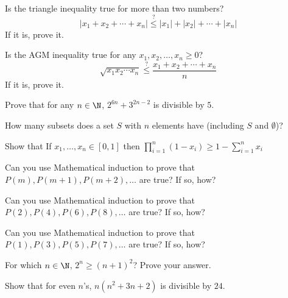 %
%

\begin{exercises}
	\begin{problist}
		\prob Is the triangle inequality true for more than two numbers?
			$$
			|x_1 + x_2 + \cdots + x_n| \stackrel{?}{\leq} |x_1| + |x_2| + \cdots + |x_n| 
			$$
			If it is, prove it.
			
		\prob Is the AGM inequality true for any $x_1, x_2, \ldots, x_n \geq 0$?
			$$
			\sqrt{x_1 x_2 \cdots x_n} \stackrel{?}{\leq}\frac{x_1 + x_2 + \cdots + x_n}{n}
			$$
			If it is, prove it.
			
		\prob Prove that for any $n \in \N$, $2^{6n}+3^{2n-2}$ is divisible by $5$.


		\prob How many subsets does a set $S$ with $n$ elements have (including $S$ and $\emptyset$)?
		
		\prob Show that If $x_1, \ldots, x_n \in [0,1]$ then $\displaystyle \prod_{i=1}^n (1-x_i) \geq 1 - \sum_{i=1}^n x_i$

		\prob Can you use Mathematical induction to prove that $P(m), P(m+1), P(m+2),\ldots$ are true? If so, how?

		\prob Can you use Mathematical induction to prove that $P(2), P(4), P(6), P(8), \ldots$ are true? If so, how?

		\prob Can you use Mathematical induction to prove that $P(1), P(3), P(5), P(7), \ldots$ are true? If so, how?

		\prob For which $n \in \N$, $2^n \geq (n+1)^2$? Prove your answer.

		\prob Show that for even $n$'s, $n(n^2+3n+2)$ is divisible by $24$.


\end{problist}
\end{exercises}
